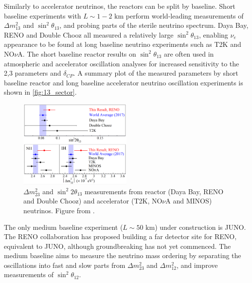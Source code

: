 Similarly to accelerator neutrinos, the reactors can be split by baseline. Short baseline experiments with $L\sim1-2\text{ km}$ perform world-leading measurements of $\Delta m^2_{13}$ and $\sin^2\theta_{13}$, and probing parts of the sterile neutrino spectrum. Daya Bay\cite{daya_bay_disc}, RENO\cite{reno_disc} and Double Chooz\cite{double_chooz} all measured a relatively large $\sin^2 \theta_{13}$, enabling $\nu_e$ appearance to be found at long baseline neutrino experiments such as T2K and NO$\nu$A. The short baseline reactor results on $\sin^2\theta_{13}$ are often used in atmospheric and accelerator oscillation analyses for increased sensitivity to the 2,3 parameters and $\delta_{CP}$. A summary plot of the measured parameters by short baseline reactor and long baseline accelerator neutrino oscillation experiments is shown in \autoref{fig:13_sector}.
\begin{figure}[h]
	\includegraphics[width=0.5\textwidth, trim={0mm 0mm 0mm 0mm}, clip,page=1]{figures/theory/reno_theta_dm13}
	\caption{$\Delta m^2_{23}$ and $\sin^2 2\theta_{13}$ measurements from reactor (Daya Bay\cite{daya_bay}, RENO\cite{reno_new} and Double Chooz\cite{double_chooz_old}) and accelerator (T2K\cite{t2k_2015}, NO$\nu$A\cite{nova_2017} and MINOS\cite{minos_numu_nue}) neutrinos. Figure from \cite{reno_new}.}
	\label{fig:13_sector}
\end{figure}

The only medium baseline experiment ($L\sim50\text{ km}$) under construction is JUNO\cite{juno}. The RENO collaboration has proposed\cite{reno_50} building a far detector site for RENO, equivalent to JUNO, although groundbreaking has not yet commenced. The medium baseline aims to measure the neutrino mass ordering by separating the oscillations into fast and slow parts from $\Delta m^2_{23}$ and $\Delta m^2_{12}$, and improve measurements of $\sin^2 \theta_{12}$.


